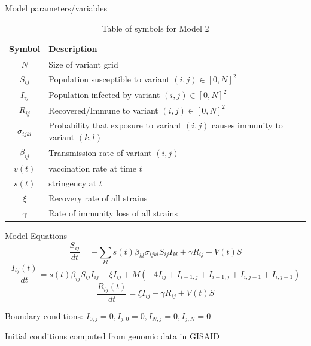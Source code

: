 \documentclass{beamer}
\begin{document}
    
\begin{frame}{Model parameters/variables}
    \begin{table}[h!]
        \begin{center}
        \begin{tabular}{c|p{8cm}}
                Symbol & Description \\
                \hline
                \hline
                $N$ & Size of variant grid \\
                $S_{ij}$ & Population susceptible to variant $(i,j) \in [0,N]^2$ \\
                $I_{ij}$ & Population infected by variant $(i,j) \in [0,N]^2$\\
                $R_{ij}$ & Recovered/Immune to variant $(i,j) \in [0,N]^2$\\
                $\sigma_{ijkl}$ & Probability that exposure to variant $(i,j)$ causes immunity \newline to variant $(k,l)$\\
                $\beta_{ij}$ & Transmission rate of variant $(i,j)$\\
                $v(t)$ & vaccination rate at time $t$\\
                $s(t)$ & stringency at $t$\\
                $\xi$ & Recovery rate of all strains \\
                $\gamma$ & Rate of immunity loss of all strains \\
        \end{tabular}
        \caption{Table of symbols for Model 2}
    
        \label{variables_2}
        \end{center}
    \end{table}
\end{frame}
\begin{frame}{Model Equations}
    \small
    \begin{equation}
        \frac{S_{ij}}{dt} = -\sum_{kl} s(t) \beta_{kl} \sigma_{ijkl} S_{ij} I_{kl} + \gamma R_{ij} - V(t)S  \label{Seqn}
    \end{equation}
    \begin{equation}
        \frac{ I_{ij}(t)}{dt} = s(t) \beta_{ij} S_{ij} I_{ij} - \xi I_{ij} + M \left(- 4I_{ij} + I_{i-1,j}  + I_{i+1,j} + I_{i,j-1} + I_{i,j+1} \right) \label{Ieqn}    
    \end{equation}
    \begin{equation}
        \frac{R_{ij}(t)}{dt} = \xi I_{ij} - \gamma R_{ij} + V(t)S \label{Reqn}
    \end{equation}

    Boundary conditions: $I_{0,j} = 0, I_{j,0} = 0,  I_{N,j} = 0, I_{j,N} = 0$

    Initial conditions computed from genomic data in GISAID 
\end{frame}
\end{document}
